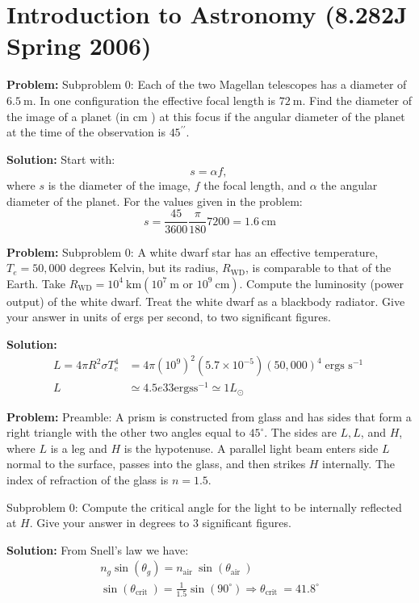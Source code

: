 \documentclass[10pt]{article}
\begin{document}
\section{Introduction to Astronomy (8.282J Spring 2006)}

\textbf{Problem:}
Subproblem 0: Each of the two Magellan telescopes has a diameter of $6.5 \mathrm{~m}$. In one configuration the effective focal length is $72 \mathrm{~m}$. Find the diameter of the image of a planet (in $\mathrm{cm}$ ) at this focus if the angular diameter of the planet at the time of the observation is $45^{\prime \prime}$.


\textbf{Solution:}
Start with:
\[
s=\alpha f \text {, }
\]
where $s$ is the diameter of the image, $f$ the focal length, and $\alpha$ the angular diameter of the planet. For the values given in the problem:
\[
s=\frac{45}{3600} \frac{\pi}{180} 7200=\boxed{1.6} \mathrm{~cm}
\]


\textbf{Problem:}
Subproblem 0: A white dwarf star has an effective temperature, $T_{e}=50,000$ degrees Kelvin, but its radius, $R_{\mathrm{WD}}$, is comparable to that of the Earth. Take $R_{\mathrm{WD}}=10^{4} \mathrm{~km}\left(10^{7} \mathrm{~m}\right.$ or $\left.10^{9} \mathrm{~cm}\right)$. Compute the luminosity (power output) of the white dwarf. Treat the white dwarf as a blackbody radiator. Give  your answer in units of ergs per second, to two significant figures.


\textbf{Solution:}
\[
\begin{aligned}
L=4 \pi R^{2} \sigma T_{e}^{4} &=4 \pi\left(10^{9}\right)^{2}\left(5.7 \times 10^{-5}\right)(50,000)^{4} \operatorname{ergs~s}^{-1} \\
L & \simeq \boxed{4.5e33} \mathrm{ergs} \mathrm{s}^{-1} \simeq 1 L_{\odot}
\end{aligned}
\]


\textbf{Problem:}
Preamble: A prism is constructed from glass and has sides that form a right triangle with the other two angles equal to $45^{\circ}$. The sides are $L, L$, and $H$, where $L$ is a leg and $H$ is the hypotenuse. A parallel light beam enters side $L$ normal to the surface, passes into the glass, and then strikes $H$ internally. The index of refraction of the glass is $n=1.5$.

Subproblem 0: Compute the critical angle for the light to be internally reflected at $H$.  Give your answer in degrees to 3 significant figures.


\textbf{Solution:}
From Snell's law we have:
\[
\begin{gathered}
n_{g} \sin \left(\theta_{g}\right)=n_{\text {air }} \sin \left(\theta_{\text {air }}\right) \\
\sin \left(\theta_{\text {crit }}\right)=\frac{1}{1.5} \sin \left(90^{\circ}\right) \Rightarrow \theta_{\text {crit }}=\boxed{41.8}^{\circ}
\end{gathered}
\]
\end{document}

